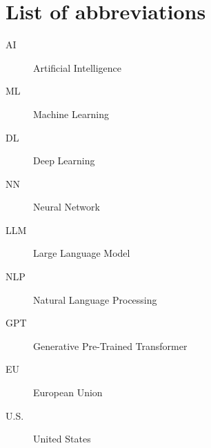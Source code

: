 \chapter*{List of abbreviations}


\begin{description}
    \item[AI] Artificial Intelligence
\end{description}

\begin{description}
    \item[ML] Machine Learning
\end{description}

\begin{description}
    \item[DL] Deep Learning
\end{description}

\begin{description}
    \item[NN] Neural Network 
\end{description}

\begin{description}
    \item[LLM] Large Language Model
\end{description}

\begin{description}
    \item[NLP] Natural Language Processing
\end{description}

\begin{description}
    \item[GPT] Generative Pre-Trained Transformer
\end{description}

\begin{description}
    \item[EU] European Union 
\end{description}

\begin{description}
    \item[U.S.] United States 
\end{description}